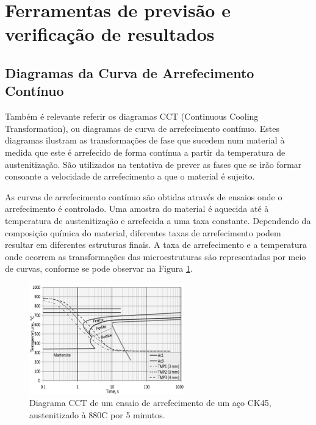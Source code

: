 \newpage
\section{Ferramentas de previsão e verificação de resultados}\label{sec:soa_ferramentas}
\subsection{Diagramas da Curva de Arrefecimento Contínuo}\label{ssec:diagramas_CCT}
Também é relevante referir os diagramas CCT (Continuous Cooling Transformation), ou diagramas de curva de arrefecimento contínuo. Estes diagramas ilustram as transformações de fase que sucedem num material à medida que este é arrefecido de forma contínua a partir da temperatura de austenitização. São utilizados na tentativa de prever as fases que se irão formar consoante a velocidade de arrefecimento a que o material é sujeito.
\par
As curvas de arrefecimento contínuo são obtidas através de ensaios onde o arrefecimento é controlado. Uma amostra do material é aquecida até à temperatura de austenitização e arrefecida a uma taxa constante. Dependendo da composição química do material, diferentes taxas de arrefecimento podem resultar em diferentes estruturas finais. A taxa de arrefecimento e a temperatura onde ocorrem as transformações das microestruturas são representadas por meio de curvas, conforme se pode observar na Figura \ref{fig:CCT_SOA}.
\begin{figure}[htb]
    \centering
    \includegraphics[width = 0.6\textwidth]{Figures/Cap2/CCT_SOA.png}
    \caption[Diagrama CCT de um aço CK45]%
    {Diagrama CCT de um ensaio de arrefecimento de um aço CK45, austenitizado à 880\textdegree C por 5 minutos\cite{Karli2016}.}
    \label{fig:CCT_SOA}
\end{figure}
